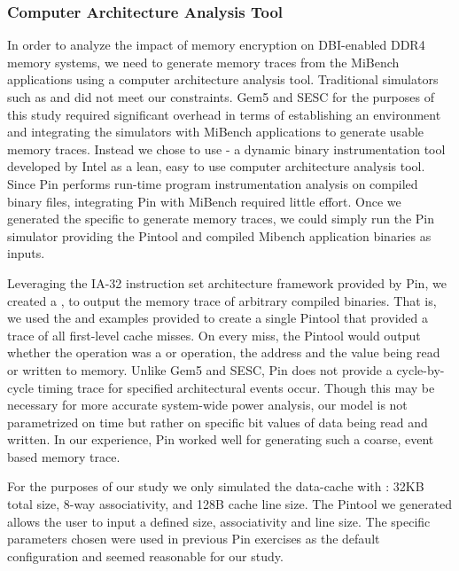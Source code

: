 \subsubsection{Computer Architecture Analysis Tool}
In order to analyze the impact of memory encryption on DBI-enabled DDR4 memory
systems, we need to generate memory traces from the MiBench applications using
a computer architecture analysis tool. Traditional simulators such as 
\cite{gem5} and  \cite{esesc} did not meet our constraints. Gem5 and
SESC for the purposes of this study required significant overhead in terms of
establishing an environment and integrating the simulators with MiBench
applications to generate usable memory traces. Instead we chose to use 
\cite{pin} - a dynamic binary instrumentation tool developed by Intel as a
lean, easy to use computer architecture analysis tool. Since Pin performs run-time
program instrumentation analysis on compiled binary files, integrating Pin with
MiBench required little effort. Once we generated the specific  to
generate memory traces, we could simply run the Pin simulator providing the
Pintool and compiled Mibench application binaries as inputs.

Leveraging the IA-32 instruction set architecture framework provided by Pin, we
created a , to output the memory trace of arbitrary compiled
binaries. That is, we used the  and  examples provided
to create a single Pintool that provided a trace of all first-level cache
misses. On every miss, the Pintool would output whether the operation was a
 or  operation, the address and the value being read or
written to memory. Unlike Gem5 and SESC, Pin does not provide a cycle-by-cycle
timing trace for specified architectural events occur. Though this may be
necessary for more accurate system-wide power analysis, our model is not
parametrized on time but rather on specific bit values of data being read and
written. In our experience, Pin worked well for generating such a coarse, event
based memory trace.

For the purposes of our study we only simulated the data-cache with : 32KB
total size, 8-way associativity, and 128B cache line size. The Pintool we
generated allows the user to input a defined size, associativity and line size.
The specific parameters chosen were used in previous Pin exercises as the
default configuration and seemed reasonable for our study.


